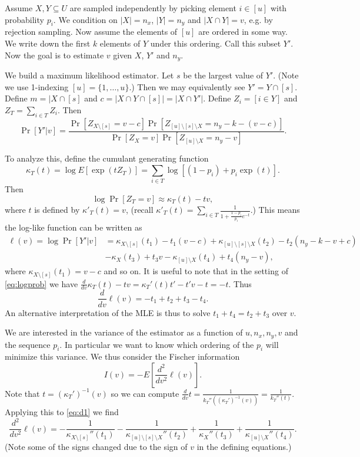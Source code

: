 \documentclass[11pt]{article}
\begin{document}
Assume $X,Y\subseteq U$ are sampled independently by picking element $i\in [u]$ with probability $p_i$.
We condition on $|X|=n_x$, $|Y|=n_y$ and $|X\cap Y|=v$,
e.g. by rejection sampling.
Now assume the elements of $[u]$ are ordered in some way.
We write down the first $k$ elements of $Y$ under this ordering.
Call this subset $Y'$.
Now the goal is to estimate $v$ given $X$, $Y'$ and $n_y$.

We build a maximum likelihood estimator.
Let $s$ be the largest value of $Y'$.
(Note we use 1-indexing $[u]=\{1,\dots,u\}$.)
Then we may equivalently see $Y' = Y \cap [s]$.
Define $m=|X\cap[s]$ and $c=|X\cap Y\cap [s]| = |X\cap Y'|$.
Define $Z_i = [i\in Y]$ and $Z_T = \sum_{i\in T} Z_i$.
Then
\[
   \Pr[Y' | v]
   = \frac{
      \Pr[Z_{X\setminus [s]}=v-c]
      \Pr[Z_{[u]\setminus [s]\setminus X}=n_y-k-(v-c)]
   }{
      \Pr[Z_{X}=v]
      \Pr[Z_{[u]\setminus X}=n_y-v]
   }
   .
\]

To analyze this, define the cumulant generating function
\[
   \kappa_T(t)
   = \log E[\exp(t Z_T)]
   = \sum_{i\in T} \log[(1-p_i) + p_i \exp(t)]
   .
\]
Then
\[
   \log\Pr[Z_{T}=v] \approx \kappa_T(t) - t v,
   \label{eq:logprob}
\]
where $t$ is defined by $\kappa'_T(t) = v$, (recall $\kappa'_T(t) = \sum_{i\in T}\frac{1}{1+\frac{1-p_i}{p_i}e^{-t}}$.)
This means the log-like function can be written as
\begin{align}
   \ell(v) = \log\Pr[Y' | v]
   &= 
   \kappa_{X\setminus [s]}(t_1)-t_1(v-c)
   +\kappa_{[u]\setminus [s]\setminus X}(t_2)-t_2(n_y-k-v+c)
   \\
   &-\kappa_{X}(t_3)+t_3v
   -\kappa_{[u]\setminus X}(t_4)+t_4(n_y-v)
   ,
\end{align}
where $\kappa_{X\setminus [s]}(t_1) = v-c$ and so on.
It is useful to note that in the setting of \cref{eq:logprob}
we have $\frac{d}{dv}\kappa_T(t)-tv = \kappa_T'(t)t' - t'v - t = -t$.
Thus
\[
   \frac{d}{dv}\ell(v) = -t_1+t_2+t_3-t_4.
   \label{eq:d1}
\]
An alternative interpretation of the MLE is thus to solve $t_1+t_4=t_2+t_3$ over $v$.

We are interested in the variance of the estimator as a function of $u, n_x, n_y, v$ and the sequence $p_i$.
In particular we want to know which ordering of the $p_i$ will minimize this variance.
We thus consider the Fischer information
\[
   I(v) = -E[\frac{d^2}{dv^2}\ell(v)].
\]
Note that $t=(\kappa_T')^{-1}(v)$ so we can compute $\frac{d}{dv}t = \frac{1}{k_T''((\kappa_T')^{-1}(v))} = \frac{1}{k_T''(t)}$.
Applying this to \cref{eq:d1} we find
\[
   \frac{d^2}{dv^2}\ell(v)
   =
   -\frac{1}{\kappa_{X\setminus [s]}''(t_1)}
   -\frac{1}{\kappa_{[u]\setminus [s] \setminus X}''(t_2)}
   +\frac{1}{\kappa_{X}''(t_3)}
   +\frac{1}{\kappa_{[u]\setminus X}''(t_4)}.
\]
(Note some of the signs changed due to the sign of $v$ in the defining equations.)
\end{document}
